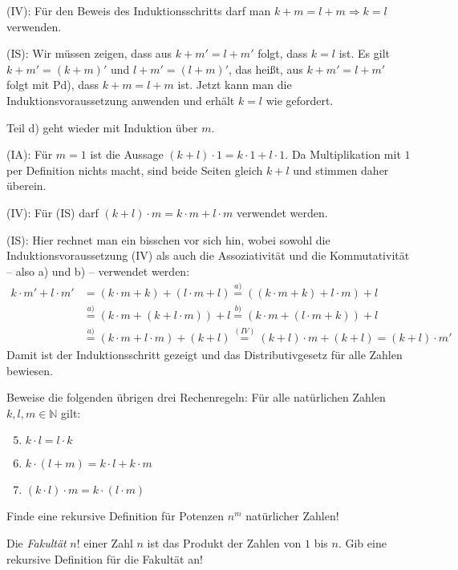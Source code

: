 \documentclass{zusammenfassung}
\begin{document}
(IV): Für den Beweis des Induktionsschritts darf man $k+m=l+m\Rightarrow k=l$ verwenden.

(IS): Wir müssen zeigen, dass aus $k+m'=l+m'$ folgt, dass $k=l$ ist. Es gilt $k+m'=(k+m)'$ und $l+m'=(l+m)'$, das heißt, aus
$k+m'=l+m'$ folgt mit Pd), dass $k+m=l+m$ ist. Jetzt kann man die Induktionsvoraussetzung anwenden und erhält $k=l$ wie gefordert.

Teil d) geht wieder mit Induktion über $m$.

(IA): Für $m=1$ ist die Aussage $(k+l)\cdot 1=k\cdot 1+l\cdot 1$. Da Multiplikation mit $1$ per Definition nichts macht, sind
beide Seiten gleich $k+l$ und stimmen daher überein.

(IV): Für (IS) darf $(k+l)\cdot m=k\cdot m+l\cdot m$ verwendet werden.

(IS): Hier rechnet man ein bisschen vor sich hin, wobei sowohl die Induktionsvoraussetzung (IV) als auch die Assoziativität und
die Kommutativität -- also a) und b) -- verwendet werden:
\begin{align*}
	k\cdot m'+l\cdot m'&=(k\cdot m+k)+(l\cdot m+l)\overset{a)}{=}((k\cdot m+k)+l\cdot m)+l\\
																			 &\overset{a)}{=}(k\cdot m+(k+l\cdot m))+l\overset{b)}{=}(k\cdot m+(l\cdot m+k))+l\\
																			 &\overset{a)}{=}(k\cdot m+l\cdot m)+(k+l)\overset{(IV)}{=}(k+l)\cdot m+(k+l)=(k+l)\cdot m'
\end{align*}
Damit ist der Induktionsschritt gezeigt und das Distributivgesetz für alle Zahlen bewiesen.

\begin{aufgabe}
	Beweise die folgenden übrigen drei Rechenregeln: Für alle natürlichen Zahlen $k,l,m\in\mathbb N$ gilt:
	\begin{enumerate}
			\setcounter{enumi}{4}
		\item $k\cdot l=l\cdot k$
		\item $k\cdot(l+m)=k\cdot l+k\cdot m$
		\item $(k\cdot l)\cdot m=k\cdot(l\cdot m)$
	\end{enumerate}
\end{aufgabe}

\begin{aufgabe}
	Finde eine rekursive Definition für Potenzen $n^m$ natürlicher Zahlen!
\end{aufgabe}

\begin{aufgabe}
	Die \emph{Fakultät} $n!$ einer Zahl $n$ ist das Produkt der Zahlen von $1$ bis $n$. Gib eine rekursive Definition für die
	Fakultät an!
\end{aufgabe}
\end{document}
